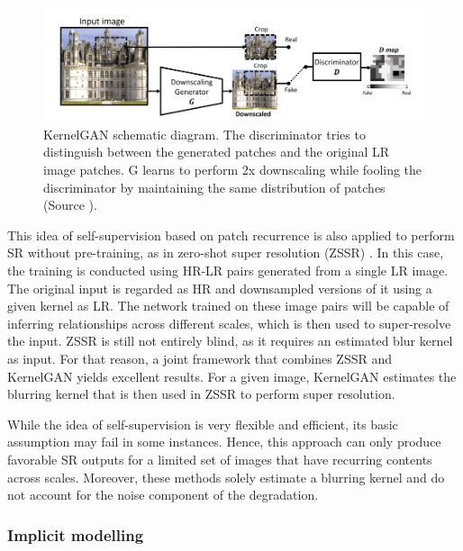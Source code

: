         \begin{figure}[H]
            \centering
            \includegraphics[width=\textwidth]{Includes/2-kernelGAN.png}
            \caption{KernelGAN schematic diagram. The discriminator tries to distinguish between the generated patches and the original LR image patches. G learns to perform 2x downscaling while fooling the discriminator by maintaining the same distribution of patches (Source \cite{bellkligler2020blind}).}    
            \label{fig:2-kernelGAN}
        \end{figure}

        This idea of self-supervision based on patch recurrence is also applied to perform SR without pre-training, as in zero-shot super resolution (ZSSR) \cite{shocher2017zeroshot}.
        In this case, the training is conducted using HR-LR pairs generated from a single LR image.
        The original input is regarded as HR and downsampled versions of it using a given kernel as LR. 
        The network trained on these image pairs will be capable of inferring relationships across different scales, which is then used to super-resolve the input.
        ZSSR is still not entirely blind, as it requires an estimated blur kernel as input. 
        For that reason, a joint framework that combines ZSSR and KernelGAN yields excellent results.
        For a given image, KernelGAN estimates the blurring kernel that is then used in ZSSR to perform super resolution. 

        While the idea of self-supervision is very flexible and efficient, its basic assumption may fail in some instances.
        Hence, this approach can only produce favorable SR outputs for a limited set of images that have recurring contents across scales. Moreover, these methods solely estimate a blurring kernel and do not account for the noise component of the degradation.



        \subsubsection{Implicit modelling} \label{subsubsec:implicit-modelling}

